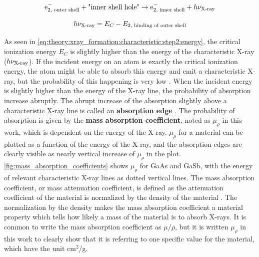 \begin{equation}
    \label{eq:theory:xray_formation:characteristic:step2}
    \textnormal{e}^-_{2 {\textnormal{, outer shell}}} + \textnormal{"inner shell hole"} \rightarrow \textnormal{e}^-_{2 {\textnormal{, inner shell}}} + h\nu_{\textnormal{X-ray}}
\end{equation}


\begin{equation}
    \label{eq:theory:xray_formation:characteristic:step2:energy}
    h\nu_{\textnormal{X-ray}} = E_C - E_{2 {\textnormal{, binding of outer shell}}}
\end{equation}


As seen in \cref{eq:theory:xray_formation:characteristic:step2:energy}, the critical ionization energy $E_C$ is slightly higher than the energy of the characteristic X-ray ($h\nu_{\textnormal{X-ray}}$).
If the incident energy on an atom is exactly the critical ionization energy, the atom might be able to absorb this energy and emit a characteristic X-ray, but the probability of this happening is very low \cite{hollas_modern_2004,goldstein_scanning_2018}.
When the incident energy is slightly higher than the energy of the X-ray line, the probability of absorption increase abruptly.
The abrupt increase of the absorption slightly above a characteristic X-ray line is called an \textbf{absorption edge} \cite{goldstein_scanning_2018}.
The probability of absorption is given by the \textbf{mass absorption coefficient}, noted as $\mu_\rho$ in this work, which is dependent on the energy of the X-ray.
$\mu_\rho$ for a material can be plotted as a function of the energy of the X-ray, and the absorption edges are clearly visible as nearly vertical increase of $\mu_\rho$ in the plot.
\cref{fig:mass_absorption_coefficients} shows $\mu_\rho$ for GaAs and GaSb, with the energy of relevant characteristic X-ray lines as dotted vertical lines.
The mass absorption coefficient, or mass attenuation coefficient, is defined as the attenuation coefficient of the material is normalized by the density of the material \cite{goldstein_scanning_2018}.
The normalization by the density makes the mass absorption coefficient a material property which tells how likely a mass of the material is to absorb X-rays.
It is common to write the mass absorption coefficient as $\mu/\rho$, but it is written $\mu_\rho$ in this work to clearly show that it is referring to one specific value for the material, which have the unit cm$^2$/g.
